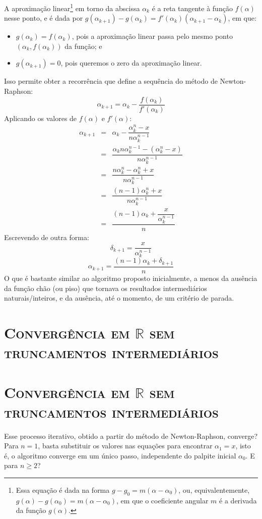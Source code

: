 \documentclass{article}
\let \sectionBkp = \section
\newcommand{\sectionFormatter}[1]{
    \centering\large\textbf{\textsc{#1}}}
\renewcommand{\section}[2]
    {\ifthenelse{\equal{#1}{*}}
        {\sectionBkp*{\sectionFormatter{#2}}}
        {\sectionBkp{\sectionFormatter{#2}}}
    }
\begin{document}
A aproximação linear\footnote{
  Essa equação é dada na forma $g - g_0 = m (\alpha - \alpha_0)$,
  ou, equivalentemente,
  $g(\alpha) - g(\alpha_0) = m (\alpha - \alpha_0)$,
  em que o coeficiente angular $m$ é a derivada da função $g(\alpha)$.
} em torno da abscissa $\alpha_k$
é a reta tangente à função $f(\alpha)$ nesse ponto,
e é dada por
$g(\alpha_{k+1}) - g(\alpha_k) =
 f'(\alpha_k) \left( \alpha_{k+1} - \alpha_k \right)$,
em que:
\begin{itemize}
  \item
  $g(\alpha_k) = f(\alpha_k)$, pois a aproximação linear
  passa pelo mesmo ponto $(\alpha_k, f(\alpha_k))$ da função; e
  \item
  $g(\alpha_{k+1}) = 0$,
  pois queremos o zero da aproximação linear.
\end{itemize}

Isso permite obter a recorrência
que define a sequência do método de Newton-Raphson:
\[\alpha_{k+1} = \alpha_k - \dfrac{f(\alpha_k)}{f'(\alpha_k)}\]
Aplicando os valores de $f(\alpha)$ e $f'(\alpha)$:
\[
  \begin{array}{rcl}
  \alpha_{k+1}
  &=& \alpha_k - \dfrac{\alpha_k^n - x}{n \alpha_k^{n-1}} \\[5mm]
  &=& \dfrac{\alpha_k n \alpha_k^{n-1}
    - (\alpha_k^n - x)}{n \alpha_k^{n-1}} \\[5mm]
  &=& \dfrac{n \alpha_k^n - \alpha_k^n + x}{n \alpha_k^{n-1}} \\[5mm]
  &=& \dfrac{(n-1) \alpha_k^n + x}{n \alpha_k^{n-1}} \\[5mm]
  &=& \dfrac{(n-1) \alpha_k + \dfrac{x}{\alpha_k^{n-1}}}{n}
  \end{array}
\]
Escrevendo de outra forma:
\[\delta_{k+1} = \dfrac{x}{\alpha_k^{n-1}}\]
\[\alpha_{k+1} = \dfrac{(n-1) \alpha_k + \delta_{k+1}}{n}\]
O que é bastante similar ao algoritmo proposto inicialmente,
a menos da ausência da função chão (ou piso)
que tornava os resultados intermediários naturais/inteiros,
e da ausência, até o momento, de um critério de parada.


\section*{Convergência em $\mathds{R}$ sem truncamentos intermediários}

Esse processo iterativo,
obtido a partir do método de Newton-Raphson,
converge?
Para $n = 1$, basta substituir os valores nas equações
para encontrar $\alpha_1 = x$,
isto é, o algoritmo converge em um único passo,
independente do palpite inicial $\alpha_0$.
E para $n \ge 2$?
\end{document}
